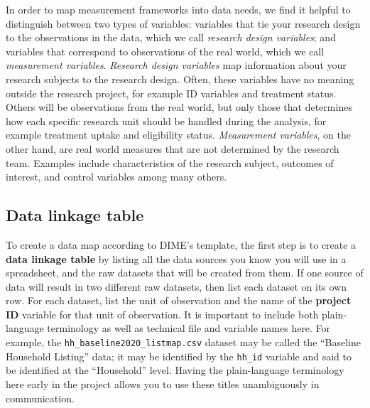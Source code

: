 In order to map measurement frameworks into data needs,
we find it helpful to distinguish between two types of variables:
variables that tie your research design
to the observations in the data,
which we call \textit{research design variables};
and variables that correspond to observations of the real world,
which we call \textit{measurement variables}.
\textit{Research design variables} map information
about your research subjects to the research design.
Often, these variables have no meaning outside the research project,
for example ID variables and treatment status.
Others will be observations from the real world,
but only those that determines how each specific research unit 
should be handled during the analysis, 
for example treatment uptake and eligibility status.
\textit{Measurement variables}, on the other hand,
are real world measures that are not determined by the research team.
Examples include characteristics of the research subject,
outcomes of interest, and control variables among many others.



\subsection{Data linkage table}

To create a data map according to DIME's template,
the first step is to create a \textbf{data linkage table} by listing
all the data sources you know you will use in a spreadsheet,
and the raw datasets that will be created from them.
If one source of data will result in two different raw datasets,
then list each dataset on its own row.
For each dataset, list the unit of observation
and the name of the \textbf{project ID}
variable for that unit of observation.
It is important to include both plain-language terminology
as well as technical file and variable names here.
For example, the \texttt{hh\_baseline2020\_listmap.csv} dataset
may be called the ``Baseline Household Listing'' data;
it may be identified by the \texttt{hh\_id} variable
and said to be identified at the ``Household'' level.
Having the plain-language terminology here early in the project
allows you to use these titles unambiguously in communication.

